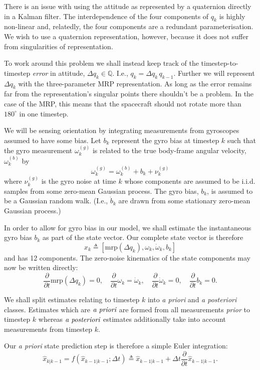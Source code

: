 \documentclass[a4paper]{paper}
\begin{document}
There is an issue with using the attitude as represented by a quaternion
directly in a Kalman filter. The interdependence of the four components of $q_k$
is highly non-linear and, relatedly, the four components are a redundant
parameterisation. We wish to use a quaternion representation, however, because
it does not suffer from singularities of representation.

To work around this problem we shall instead keep track of the
timestep-to-timestep \emph{error} in attitude, $\Delta q_k \in \mathbb{Q}$.
I.e., $q_k = \Delta q_k \, q_{k-1}$. Further we will represent $\Delta
q_k$ with the three-parameter MRP representation. As long as the error
remains far from the representation's singular points there shouldn't be a
problem. In the case of the MRP, this means that the spacecraft should not
rotate more than $180^\circ$ in one timestep.

We will be sensing orientation by integrating measurements from gyroscopes
assumed to have some bias. Let $b_k$
represent the gyro bias at timestep $k$ such that the gyro measurement
$\omega^{(g)}_k$ is related to the true body-frame angular velocity,
$\omega^{(b)}_k$ by
$$
\omega^{(g)}_k = \omega^{(b)}_k + b_k + \nu^{(g)}_k
$$
where $\nu^{(g)}_k$ is the gyro noise at time $k$ whose components are assumed
to be i.i.d. samples from some zero-mean Gaussian process. The gyro bias, $b_k$,
is assumed to be a Gaussian random walk. (I.e., $\dot{b}_k$ are drawn from some
stationary zero-mean Gaussian process.)

In order to allow for gyro bias in our model, we shall estimate the
instantaneous gyro bias $b_k$ as part of the state vector. Our complete state
vector is therefore
$$
x_k \triangleq \left[
	\mbox{mrp}(\Delta q_k), \omega_k, \dot{\omega}_k, b_k
\right]
$$
and has 12 components. The zero-noise kinematics of the state components may now
be written directly:
$$
\frac{\partial}{\partial t} \mbox{mrp}(\Delta q_k) = 0, \quad
\frac{\partial}{\partial t} \omega_k = \dot{\omega}_k, \quad
\frac{\partial}{\partial t} \dot{\omega}_k = 0, \quad
\frac{\partial}{\partial t} b_k = 0.
$$

We shall split estimates relating to timestep $k$ into \emph{a priori} and
\emph{a posteriori} classes. Estimates which are $\emph{a priori}$ are formed
from all measurements \emph{prior} to timestep $k$ whereas $\emph{a
posteriori}$ estimates additionally take into account measurements from timestep
$k$.

Our \emph{a priori} state prediction step is therefore a simple Euler integration:
$$
\hat{x}_{k|k-1} = f\left(\hat{x}_{k-1|k-1}; \Delta t\right)
\triangleq \hat{x}_{k-1|k-1} + \Delta t \frac{\partial}{\partial t}
\hat{x}_{k-1|k-1}.
$$
\end{document}
